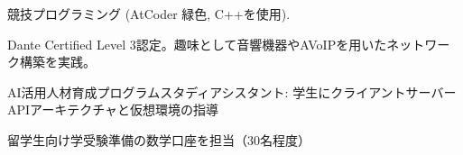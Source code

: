 

\begin{cvparagraph}

\begin{cvbullets}
    \item 競技プログラミング (AtCoder 緑色, C++を使用).
    \item Dante Certified Level 3認定。趣味として音響機器やAVoIPを用いたネットワーク構築を実践。
    \item AI活用人材育成プログラムスタディアシスタント: 学生にクライアントサーバーAPIアーキテクチャと仮想環境の指導
    \item 留学生向け学受験準備の数学口座を担当（30名程度）
\end{cvbullets}
\end{cvparagraph}
